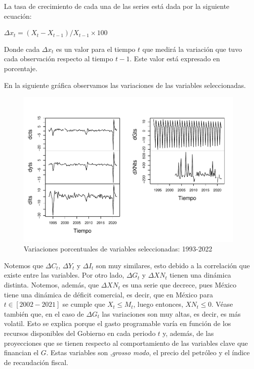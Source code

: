 \documentclass[
]{article}
\begin{document}
La tasa de crecimiento de cada una de las series está dada por la
siguiente ecuación:

\(\Delta{x_t}=(X_t - X_{t-1}) / X_{t-1} \times 100\)

Donde cada \(\Delta{x_t}\) es un valor para el tiempo \(t\) que medirá
la variación que tuvo cada observación respecto al tiempo \(t-1\). Este
valor está expresado en porcentaje.

En la siguiente gráfica observamos las variaciones de las variables
seleccionadas.

\begin{figure}
\centering
\includegraphics{Ejercicio-3_files/figure-latex/unnamed-chunk-8-1.pdf}
\caption{Variaciones porcentuales de variables seleccionadas: 1993-2022}
\end{figure}

Notemos que \(\Delta{C_t}\), \(\Delta{Y_t}\) y \(\Delta{I_t}\) son muy
similares, esto debido a la correlación que existe entre las variables.
Por otro lado, \(\Delta{G_t}\) y \(\Delta{XN_t}\) tienen una dinámica
distinta. Notemos, además, que \(\Delta{XN_t}\) es una serie que
decrece, pues México tiene una dinámica de déficit comercial, es decir,
que en México para \(t\in[2002-2021]\) se cumple que \(X_t \leq M_t\),
luego entonces, \(XN_t\leq0\). Véase también que, en el caso de
\(\Delta{G_t}\) las variaciones son muy altas, es decir, es más volatil.
Esto se explica porque el gasto programable varía en función de los
recursos disponibles del Gobierno en cada periodo \(t\) y, además, de
las proyecciones que se tienen respecto al comportamiento de las
variables clave que financian el \(G\). Estas variables son
,\emph{grosso modo}, el precio del petróleo y el índice de recaudación
fiscal.
\end{document}
